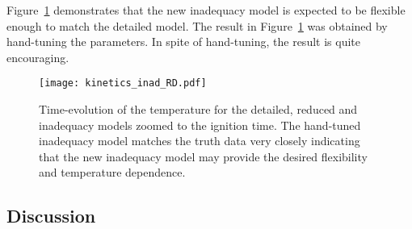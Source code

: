 \documentclass[fontsize=12pt, %
               paper=a4, %
               hyperref]{report}
\begin{document}
  Figure~\ref{fig:new_inad_demo} demonstrates that the new inadequacy 
  model is expected to be flexible enough to match the detailed model.  
  The result in Figure~\ref{fig:new_inad_demo} was obtained by 
  hand-tuning the parameters.  In spite of hand-tuning, the result 
  is quite encouraging.
  \begin{figure}[h!]
    \centering
    \texttt{[image: kinetics\_inad\_RD.pdf]}
    \caption{Time-evolution of the temperature for the detailed, reduced 
             and inadequacy models zoomed to the ignition time.  The 
             hand-tuned inadequacy model matches the truth data very 
             closely indicating that the new inadequacy model may 
             provide the desired flexibility and temperature dependence.}
    \label{fig:new_inad_demo}
  \end{figure}

  \subsection{Discussion}



\end{document}
